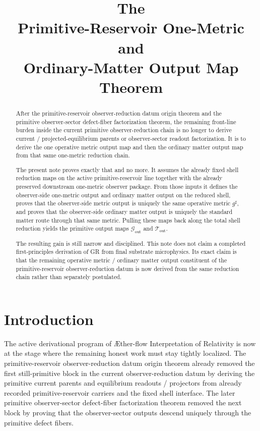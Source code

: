 \documentclass[11pt]{article}
\title{\textbf{The \TheoryName{}}\\[0.4em]
\large Primitive-Reservoir One-Metric and\\
\large Ordinary-Matter Output Map Theorem}
\author{}
\date{}
\newcommand{\Aflow}{\AE{}ther-flow}
\newcommand{\TheoryName}{\Aflow{} Interpretation of Relativity}
\newcommand{\CompletedMetric}{g^{\sharp}}
\newcommand{\MetricOut}{\mathscr G_{\mathrm{out}}}
\newcommand{\MatterOut}{\mathscr T_{\mathrm{out}}}
\begin{document}
\maketitle

\begin{abstract}
After the primitive-reservoir observer-reduction datum origin theorem and the primitive observer-sector defect-fiber factorization theorem, the remaining front-line burden inside the current primitive observer-reduction chain is no longer to derive current / projected-equilibrium parents or observer-sector readout factorization. It is to derive the one operative metric output map and then the ordinary matter output map from that same one-metric reduction chain.

The present note proves exactly that and no more. It assumes the already fixed shell reduction maps on the active primitive-reservoir line together with the already preserved downstream one-metric observer package. From those inputs it defines the observer-side one-metric output and ordinary matter output on the reduced shell, proves that the observer-side metric output is uniquely the same operative metric \(\CompletedMetric\), and proves that the observer-side ordinary matter output is uniquely the standard matter route through that same metric. Pulling these maps back along the total shell reduction yields the primitive output maps \(\MetricOut\) and \(\MatterOut\).

The resulting gain is still narrow and disciplined. This note does not claim a completed first-principles derivation of GR from final substrate microphysics. Its exact claim is that the remaining operative metric / ordinary matter output constituent of the primitive-reservoir observer-reduction datum is now derived from the same reduction chain rather than separately postulated.
\end{abstract}

\section{Introduction}

The active derivational program of \TheoryName{} is now at the stage where the remaining honest work must stay tightly localized. The primitive-reservoir observer-reduction datum origin theorem already removed the first still-primitive block in the current observer-reduction datum by deriving the primitive current parents and equilibrium readouts / projectors from already recorded primitive-reservoir carriers and the fixed shell interface. The later primitive observer-sector defect-fiber factorization theorem removed the next block by proving that the observer-sector outputs descend uniquely through the primitive defect fibers.
\end{document}

